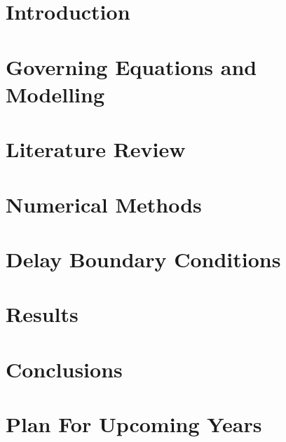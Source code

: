 \documentclass[lmr,second,hyperref,rgb,hyperref,dvipsnames]{uom_thesis_casson}
\title{\xmp@Title}
\author{\xmp@Author}
\begin{document}
\maketitle



\uomtoc

\uomstartmainbody %

\chapter{Introduction} \label{ch:intro}


\chapter{Governing Equations and Modelling} \label{ch:govern-eqns}


\chapter{Literature Review} \label{ch:lit-review}


\chapter{Numerical Methods} \label{ch:techniques}


% 

\chapter{Delay Boundary Conditions} \label{ch:delay-bcs}


\chapter{Results} \label{ch:results}


\chapter{Conclusions} \label{ch:conc}


\chapter{Plan For Upcoming Years} \label{ch:plan}



\printbibliography[title={References},heading=bibintoc]
\end{document}
